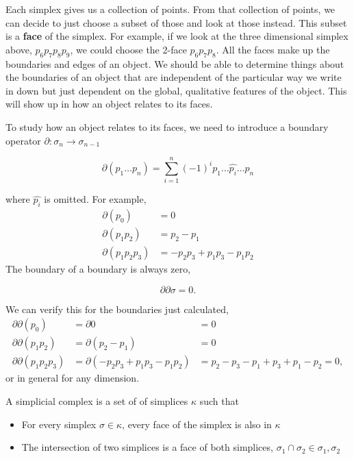 Each simplex gives us a collection of points.  From that collection of points, we can decide to just choose a subset of those and look at those instead.  This subset is a \textbf{face} of the simplex.  For example, if we look at the three dimensional simplex above, $p_6 p_7 p_8 p_9$, we could choose the 2-face $p_6 p_7 p_8$.  All the faces make up the boundaries and edges of an object. We should be able to determine things about the boundaries of an object that are independent of the particular way we write in down but just dependent on the global, qualitative features of the object.  This will show up in how an object relates to its faces.

To study how an object relates to its faces, we need to introduce a boundary operator  $ \partial: \sigma_n \rightarrow \sigma_{n-1} $
\begin{tcolorbox}
\begin{equation}
  \partial \left(p_1 \dots p_n \right)
  = \sum_{i=1}^n (-1)^{i} p_1 \dots \hat{p_i} \dots p_n
\end{equation}
\end{tcolorbox}
where $\hat{p_i}$ is omitted.  For example,
\begin{align}
  \partial(p_0) &= 0 \\
  \partial(p_1 p_2) & = p_2 - p_1 \\
  \partial(p_1 p_2 p_3) & = -p_2 p_3 + p_1 p_3 - p_1 p_2
\end{align}
The boundary of a boundary is always zero,
\begin{tcolorbox}
  \begin{equation}\label{eq:boundary_zero}
    \partial \partial \sigma =0.
  \end{equation}
\end{tcolorbox}
We can verify this for the boundaries just calculated,
\begin{align}
  \partial \partial (p_0 )& = \partial 0  &= 0 \\
  \partial \partial (p_1 p_2 )&= \partial (p_2 - p_1) &= 0 \\
  \partial \partial (p_1 p_2 p_3 )&= \partial (-p_2 p_3 + p_1 p_3 - p_1 p_2) &=
    p_2 - p_3 -p_1 + p_3  + p_1 -p_2 =0 ,
\end{align}
or in general for any dimension.





\begin{definition}
  A simplicial complex is a set of of simplices $\kappa$ such that
  \begin{itemize}
    \item For every simplex $\sigma \in \kappa$, every face of the simplex is also in $\kappa$
    \item The intersection of two simplices is a face of both simplices, $\sigma_1 \cap \sigma_2 \in \sigma_1 , \sigma_2$
  \end{itemize}
\end{definition}

